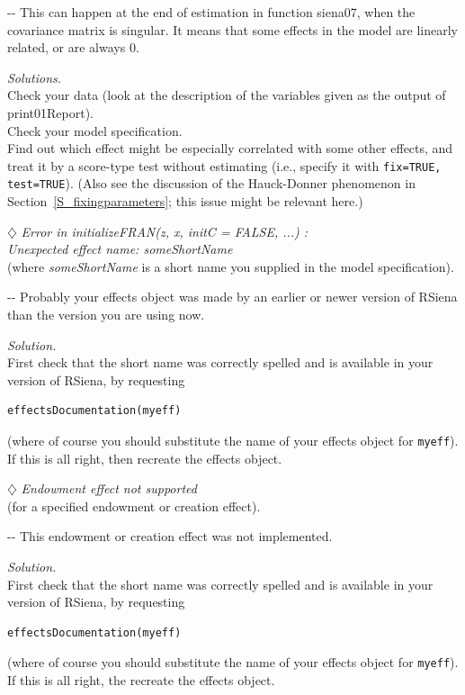 \documentclass[a4paper,fleqn,11pt]{article}
\makeatletter
\newcommand{\+}{\, + \,}
\newcommand{\sfn}[1]{\textsf{#1}}
\newcommand{\rs}{{\sf RSiena}}
\newenvironment{indentation}[2]
{\par \setlength{\leftmargin}{#1}       \setlength{\rightmargin}{#2}
  \advance\linewidth -\leftmargin       \advance\linewidth -\rightmargin
  \advance\@totalleftmargin\leftmargin  \@setpar{{\@@par}}%
  \parshape 1 \@totalleftmargin         \linewidth \ignorespaces}{\par}
\makeatother
\begin{document}
\begin{indentation}{0.04\textwidth}{0pt}
\noindent
This can happen at the end of estimation in function \sfn{siena07},
when the covariance matrix is singular.
It means that some effects in the model are linearly related,
or are always 0.
\smallskip

\noindent
\emph{Solutions.}\\
Check your data (look at the description of the variables
given as the output of \sfn{print01Report}).\\
Check your model specification.\\
Find out which effect might be especially correlated
with some other effects, and treat it by a score-type
test without estimating (i.e., specify it with
\texttt{fix=TRUE, test=TRUE}).
(Also see the discussion of the Hauck-Donner phenomenon
in Section~\ref{S_fixingparameters}; this issue might
be relevant here.)
\end{indentation}
\bigskip

\noindent $\diamondsuit$ \emph{Error in initializeFRAN(z, x, initC = FALSE, ...) :\\
  Unexpected effect name: someShortName}\\
(where \emph{someShortName} is a short name you supplied in the
model specification).
\smallskip

\begin{indentation}{0.04\textwidth}{0pt}
\noindent
Probably your effects object was made by an earlier or newer version
of {\rs} than the version you are using now.
\smallskip

\noindent
\emph{Solution.} \\
First check that the short name was correctly spelled and
is available in your version of {\rs}, by requesting
\begin{verbatim}
effectsDocumentation(myeff)
\end{verbatim}
(where of course you should substitute the name of your effects object
for \texttt{myeff}).
If this is all right, then recreate the effects object.
\end{indentation}
\bigskip


\noindent $\diamondsuit$ \emph{Endowment effect not supported}\\
(for a specified endowment or creation effect).
\smallskip

\begin{indentation}{0.04\textwidth}{0pt}
\noindent
This endowment or creation effect was not implemented.
\smallskip

\noindent
\emph{Solution.} \\
First check that the short name was correctly spelled and
is available in your version of {\rs}, by requesting
\begin{verbatim}
effectsDocumentation(myeff)
\end{verbatim}
(where of course you should substitute the name of your effects object
for \texttt{myeff}).
If this is all right, the recreate the effects object.
\end{indentation}
\bigskip
\end{document}
